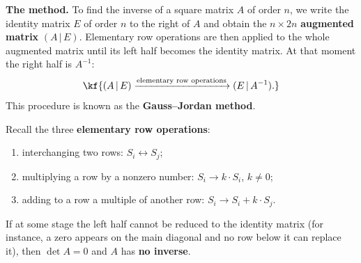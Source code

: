 
\begin{tarif}
\textbf{The method.} To find the inverse of a square matrix $A$ of order $n$, we
write the identity matrix $E$ of order $n$ to the right of $A$ and obtain the
$n\times 2n$ \textbf{augmented matrix} $(A\,|\,E)$. Elementary row operations are
then applied to the whole augmented matrix until its left half becomes the
identity matrix. At that moment the right half is $A^{-1}$:
\[\kf{(A\,|\,E) \xrightarrow{\text{elementary row operations}} (E\,|\,A^{-1}).}\]
This procedure is known as the \textbf{Gauss–Jordan method}.
\end{tarif}
Recall the three \textbf{elementary row operations}:
\begin{enumerate}[label=\arabic*)]
\item interchanging two rows: $S_i \leftrightarrow S_j$;
\item multiplying a row by a nonzero number: $S_i \to k\cdot S_i$, $k\neq 0$;
\item adding to a row a multiple of another row: $S_i \to S_i + k\cdot S_j$.
\end{enumerate}
If at some stage the left half cannot be reduced to the identity matrix (for
instance, a zero appears on the main diagonal and no row below it can replace
it), then $\det A = 0$ and $A$ has \textbf{no inverse}.
